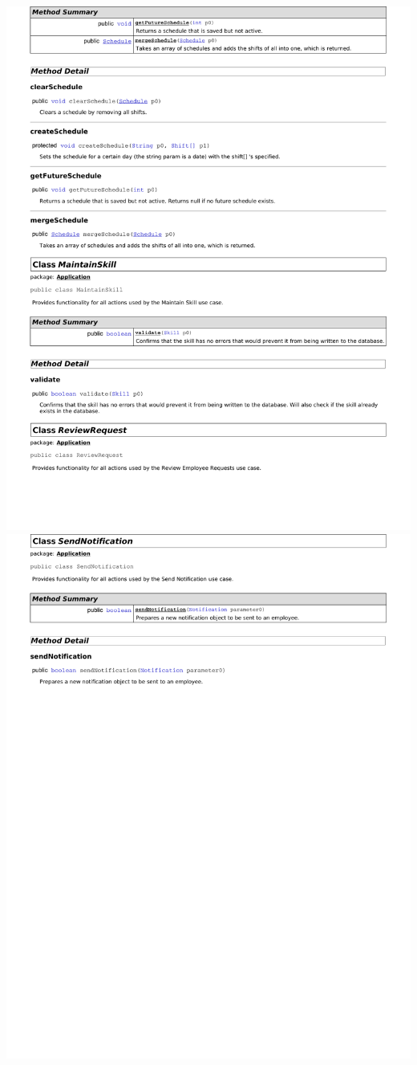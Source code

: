 \documentclass[letterpaper,12pt]{report}
\begin{document}
\newpage
\includegraphics[scale=0.9,trim=20mm 30mm 25mm 0mm]{externals/dd4.pdf}
\newpage
\includegraphics[scale=0.9,trim=20mm 30mm 25mm 0mm]{externals/dd5.pdf}
\newpage
\end{document}
